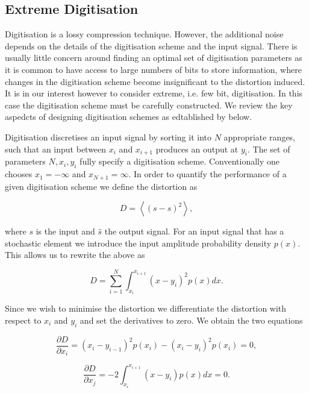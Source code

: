 \documentclass[apj]{emulateapj}
\begin{document}
\subsection{Extreme Digitisation}
\label{subsec:extremedigitisation}

Digitisation is a lossy compression technique. However, the additional noise depends on the details of the digitisation scheme and the input signal. There is usually little concern around finding an optimal set of digitisation parameters as it is common to have access to large numbers of bits to store information, where changes in the digitisation scheme become insignificant to the distortion induced. It is in our interest however to consider extreme, i.e. few bit, digitisation. In this case the digitisation scheme must be carefully constructed. We review the key aspedcts of designing digitisation schemes as edtablished by \cite{max1960} below.

Digitisation discretises an input signal by sorting it into $N$ appropriate ranges, such that an input between $x_i$ and $x_{i+1}$ produces an output at $y_i$. The set of parameters $N, x_i, y_i$ fully specify a digitisation scheme. Conventionally one chooses $x_{1} = -\infty$ and $x_{N+1} = \infty$. In order to quantify the performance of a given digitisation scheme we define the distortion as

\begin{equation} D = \left\langle  \left( s - \hat{s} \right)^2 \right\rangle, \end{equation}

where $s$ is the input and $\hat{s}$ the output signal. For an input signal that has a stochastic element we introduce the input amplitude probability density $p(x)$. This allows us to rewrite the above as

\begin{equation} D = \sum_{i = 1}^N \int_{x_i}^{x_{i+1}} \left(x-y_i\right)^2 p(x) dx. \end{equation}

Since we wish to minimise the distortion we differentiate the distortion with respect to $x_i$ and $y_i$ and set the derivatives to zero. We obtain the two equations

\begin{equation} \label{eq:distderiv1}
\frac{\partial D}{\partial x_i} = \left(x_i-y_{i-1}\right)^2 p(x_i) - \left(x_i - y_i\right)^2 p(x_i) = 0,
\end{equation}

\begin{equation} \label{eq:distderiv2}
\frac{\partial D}{\partial x_j} = -2 \int_{x_i}^{x_{i+1}} \left( x-y_i \right) p(x) dx = 0.
\end{equation}
\end{document}
